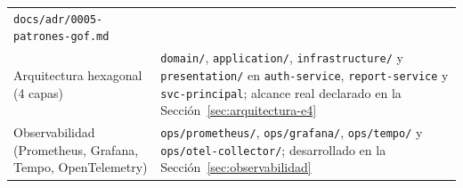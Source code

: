 \begin{table}[H]
\begin{tabular}{@{}p{3.1cm}p{9.4cm}@{}}
  \texttt{docs/adr/0005-patrones-gof.md} \\
Arquitectura hexagonal (4 capas) &
  \texttt{domain/}, \texttt{application/}, \texttt{infrastructure/} y \texttt{presentation/} en
  \texttt{auth-service}, \texttt{report-service} y \texttt{svc-principal}; alcance real declarado
  en la Sección~\ref{sec:arquitectura-e4} \\
Observabilidad (Prometheus, Grafana, Tempo, OpenTelemetry) &
  \texttt{ops/prometheus/}, \texttt{ops/grafana/}, \texttt{ops/tempo/} y
  \texttt{ops/otel-collector/}; desarrollado en la Sección~\ref{sec:observabilidad} \\
\bottomrule
\end{tabular}
\end{table}
